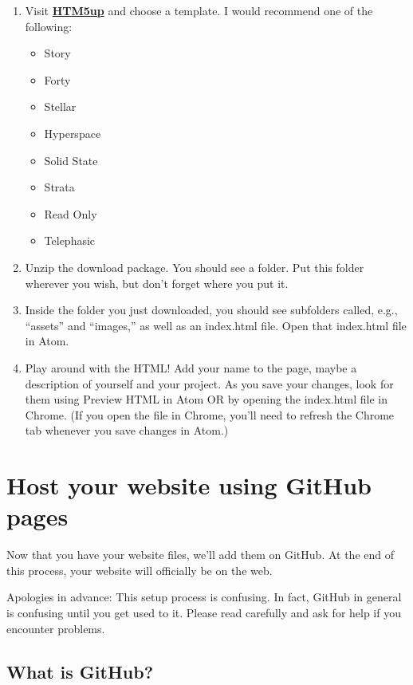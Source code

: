 \documentclass[]{book}
\providecommand{\tightlist}{%
  \setlength{\itemsep}{0pt}\setlength{\parskip}{0pt}}
\theoremstyle{definition}
\theoremstyle{definition}
\theoremstyle{definition}
\theoremstyle{remark}
\begin{document}
\begin{enumerate}
\def\labelenumi{\arabic{enumi}.}
\tightlist
\item
  Visit \textbf{\href{https://html5up.net/}{HTM5up}} and choose a
  template. I would recommend one of the following:

  \begin{itemize}
  \tightlist
  \item
    Story
  \item
    Forty
  \item
    Stellar
  \item
    Hyperspace
  \item
    Solid State
  \item
    Strata
  \item
    Read Only
  \item
    Telephasic
  \end{itemize}
\item
  Unzip the download package. You should see a folder. Put this folder
  wherever you wish, but don't forget where you put it.
\item
  Inside the folder you just downloaded, you should see subfolders
  called, e.g., ``assets'' and ``images,'' as well as an index.html
  file. Open that index.html file in Atom.
\item
  Play around with the HTML! Add your name to the page, maybe a
  description of yourself and your project. As you save your changes,
  look for them using Preview HTML in Atom OR by opening the index.html
  file in Chrome. (If you open the file in Chrome, you'll need to
  refresh the Chrome tab whenever you save changes in Atom.)
\end{enumerate}

\hypertarget{host-your-website-using-github-pages}{%
\section{Host your website using GitHub
pages}\label{host-your-website-using-github-pages}}

Now that you have your website files, we'll add them on GitHub. At the
end of this process, your website will officially be on the web.

Apologies in advance: This setup process is confusing. In fact, GitHub
in general is confusing until you get used to it. Please read carefully
and ask for help if you encounter problems.

\hypertarget{what-is-github}{%
\subsection{What is GitHub?}\label{what-is-github}}
\end{document}
